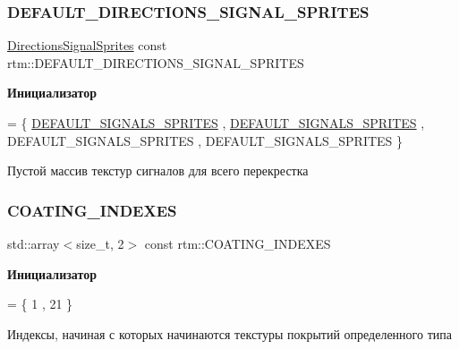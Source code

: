 \subsubsection{\texorpdfstring{D\+E\+F\+A\+U\+L\+T\+\_\+\+D\+I\+R\+E\+C\+T\+I\+O\+N\+S\+\_\+\+S\+I\+G\+N\+A\+L\+\_\+\+S\+P\+R\+I\+T\+ES}{DEFAULT\_DIRECTIONS\_SIGNAL\_SPRITES}}
{\footnotesize\ttfamily \hyperlink{namespacertm_ac9f276c8ed33ee992eb1a1f04a8254a0}{Directions\+Signal\+Sprites} const rtm\+::\+D\+E\+F\+A\+U\+L\+T\+\_\+\+D\+I\+R\+E\+C\+T\+I\+O\+N\+S\+\_\+\+S\+I\+G\+N\+A\+L\+\_\+\+S\+P\+R\+I\+T\+ES}

{\bfseries Инициализатор}
\begin{DoxyCode}
= \{
        \hyperlink{namespacertm_a83e72513cb0cd2f63cff211387bdbb31}{DEFAULT\_SIGNALS\_SPRITES}
        , \hyperlink{namespacertm_a83e72513cb0cd2f63cff211387bdbb31}{DEFAULT\_SIGNALS\_SPRITES}
        , DEFAULT\_SIGNALS\_SPRITES
        , DEFAULT\_SIGNALS\_SPRITES
    \}
\end{DoxyCode}


Пустой массив текстур сигналов для всего перекрестка 

\mbox{\label{namespacertm_aa92f0dfd3e94d47bed3e7dd2c2e82571}} 
\subsubsection{\texorpdfstring{C\+O\+A\+T\+I\+N\+G\+\_\+\+I\+N\+D\+E\+X\+ES}{COATING\_INDEXES}}
{\footnotesize\ttfamily std\+::array$<$size\+\_\+t, 2$>$ const rtm\+::\+C\+O\+A\+T\+I\+N\+G\+\_\+\+I\+N\+D\+E\+X\+ES}

{\bfseries Инициализатор}
\begin{DoxyCode}
= \{
        1       
        , 21    
    \}
\end{DoxyCode}


Индексы, начиная с которых начинаются текстуры покрытий определенного типа 

\mbox{\label{namespacertm_a9f4d245ca5d201a5853914c175d0d17f}} 
